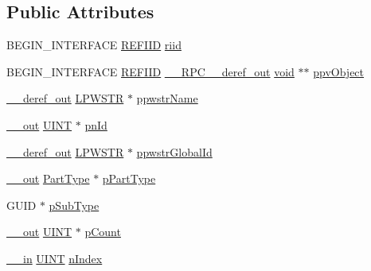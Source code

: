 \subsection*{Public Attributes}
\begin{DoxyCompactItemize}
\item 
B\+E\+G\+I\+N\+\_\+\+I\+N\+T\+E\+R\+F\+A\+CE \hyperlink{px__win__ds_8c_a80ec49c8ae61e234197d5071d2df497d}{R\+E\+F\+I\+ID} \hyperlink{struct_i_part_vtbl_a089005c5fe84deaa590c2401d4bf1a5a}{riid}
\item 
B\+E\+G\+I\+N\+\_\+\+I\+N\+T\+E\+R\+F\+A\+CE \hyperlink{px__win__ds_8c_a80ec49c8ae61e234197d5071d2df497d}{R\+E\+F\+I\+ID} \hyperlink{rpcsal_8h_a23bc188526f10656f9c79d950f6c3192}{\+\_\+\+\_\+\+R\+P\+C\+\_\+\+\_\+deref\+\_\+out} \hyperlink{sound_8c_ae35f5844602719cf66324f4de2a658b3}{void} $\ast$$\ast$ \hyperlink{struct_i_part_vtbl_aefa5beaf3ef646752b4c8638184c9736}{ppv\+Object}
\item 
\hyperlink{sal_8h_a7dec33add44f7afd0eb61b1249a35298}{\+\_\+\+\_\+deref\+\_\+out} \hyperlink{mapinls_8h_acc28f72b93422cfd63a60e5a102a77b1}{L\+P\+W\+S\+TR} $\ast$ \hyperlink{struct_i_part_vtbl_a734a223870e602d69566eb3a6c6e8459}{ppwstr\+Name}
\item 
\hyperlink{sal_8h_abb4c3c1135aab6c47cff22e7c16efb74}{\+\_\+\+\_\+out} \hyperlink{mapinls_8h_a36cb3b01d81ffd844bbbfb54003e06ec}{U\+I\+NT} $\ast$ \hyperlink{struct_i_part_vtbl_a046f3c9703bf56e89f70258825328f4e}{pn\+Id}
\item 
\hyperlink{sal_8h_a7dec33add44f7afd0eb61b1249a35298}{\+\_\+\+\_\+deref\+\_\+out} \hyperlink{mapinls_8h_acc28f72b93422cfd63a60e5a102a77b1}{L\+P\+W\+S\+TR} $\ast$ \hyperlink{struct_i_part_vtbl_a5b45a4424297e276388afef83c381a4f}{ppwstr\+Global\+Id}
\item 
\hyperlink{sal_8h_abb4c3c1135aab6c47cff22e7c16efb74}{\+\_\+\+\_\+out} \hyperlink{devicetopology_8h_a3942d8d756cdcc33ac0ccd4eadd999fa}{Part\+Type} $\ast$ \hyperlink{struct_i_part_vtbl_ac27e43b65edc50005aca2fe65616dfc0}{p\+Part\+Type}
\item 
G\+U\+ID $\ast$ \hyperlink{struct_i_part_vtbl_a50e0f46d9dfabe779979bfb323bd5278}{p\+Sub\+Type}
\item 
\hyperlink{sal_8h_abb4c3c1135aab6c47cff22e7c16efb74}{\+\_\+\+\_\+out} \hyperlink{mapinls_8h_a36cb3b01d81ffd844bbbfb54003e06ec}{U\+I\+NT} $\ast$ \hyperlink{struct_i_part_vtbl_a2ccdd4ea006ed0038fca98d2b19914e2}{p\+Count}
\item 
\hyperlink{sal_8h_a3f6b8655e1aa9dfc15a9029f0343009e}{\+\_\+\+\_\+in} \hyperlink{mapinls_8h_a36cb3b01d81ffd844bbbfb54003e06ec}{U\+I\+NT} \hyperlink{struct_i_part_vtbl_aa1aa2e75942b46a0ae65f2d022c0c4d5}{n\+Index}
$$
\end{DoxyCompactItemize}
